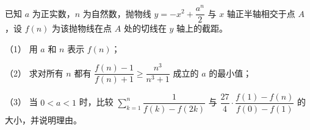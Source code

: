 \begin{question}
已知 $a$ 为正实数，$n$ 为自然数，抛物线 $y=-x^2+\dfrac{a^n}2$ 与 $x$ 轴正半轴相交于点 $A$，设 $f(n)$ 为该抛物线在点 $A$ 处的切线在 $y$ 轴上的截距。

（1） 用 $a$ 和 $n$ 表示 $f(n)$；

（2） 求对所有 $n$ 都有 $\dfrac{f(n)-1}{f(n)+1}\geqslant\dfrac{n^3}{n^3+1}$ 成立的 $a$ 的最小值；

（3） 当 $0<a<1$ 时，比较 $\sum\limits_{k=1}^{n}\dfrac1{f(k)-f(2k)}$ 与 $\dfrac{27}4\cdot\dfrac{f(1)-f(n)}{f(0)-f(1)}$ 的大小，并说明理由。

\end{question}